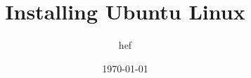 \documentclass{beamer}
\title{Installing Ubuntu Linux}
\author{hef}
\date{\today}
\begin{document}
\frame{\titlepage}
\section[outline]{}
\frame{\tableofcontents}
\end{document}

